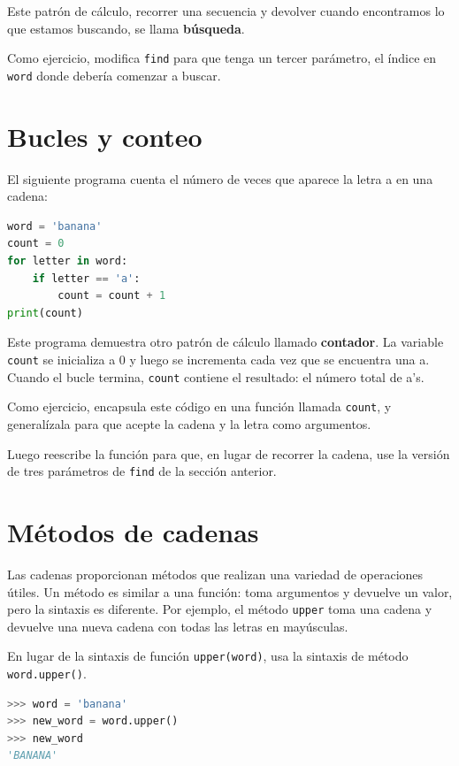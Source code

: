 Este patrón de cálculo, recorrer una secuencia y devolver cuando encontramos lo que estamos buscando, se llama \textbf{búsqueda}.

Como ejercicio, modifica \texttt{find} para que tenga un tercer parámetro, el índice en \texttt{word} donde debería comenzar a buscar.

\section{Bucles y conteo}

El siguiente programa cuenta el número de veces que aparece la letra a en una cadena:

\begin{lstlisting}[language=Python]
word = 'banana'
count = 0
for letter in word:
    if letter == 'a':
        count = count + 1
print(count)
\end{lstlisting}

Este programa demuestra otro patrón de cálculo llamado \textbf{contador}. La variable \texttt{count} se inicializa a 0 y luego se incrementa cada vez que se encuentra una a. Cuando el bucle termina, \texttt{count} contiene el resultado: el número total de a's.

Como ejercicio, encapsula este código en una función llamada \texttt{count}, y generalízala para que acepte la cadena y la letra como argumentos.

Luego reescribe la función para que, en lugar de recorrer la cadena, use la versión de tres parámetros de \texttt{find} de la sección anterior.

\section{Métodos de cadenas}

Las cadenas proporcionan métodos que realizan una variedad de operaciones útiles. Un método es similar a una función: toma argumentos y devuelve un valor, pero la sintaxis es diferente. Por ejemplo, el método \texttt{upper} toma una cadena y devuelve una nueva cadena con todas las letras en mayúsculas.

En lugar de la sintaxis de función \texttt{upper(word)}, usa la sintaxis de método \texttt{word.upper()}.

\begin{lstlisting}[language=Python]
>>> word = 'banana'
>>> new_word = word.upper()
>>> new_word
'BANANA'
\end{lstlisting}

